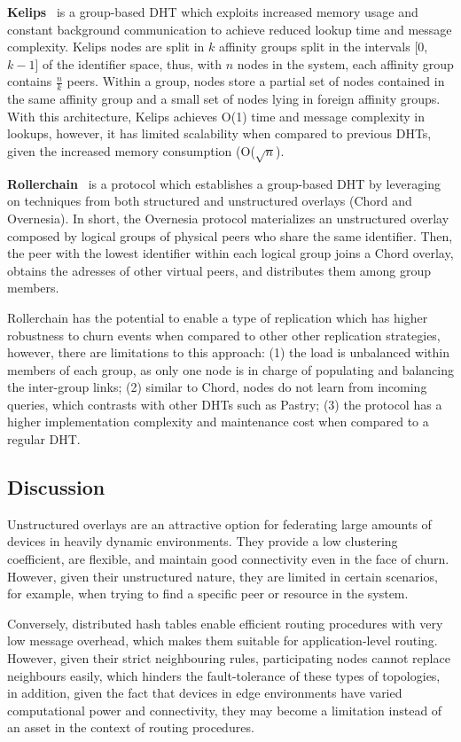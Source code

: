 \textbf{Kelips}~\cite{gupta2003kelips} is a group-based DHT which exploits increased memory usage and constant background communication to achieve reduced lookup time and message complexity. Kelips nodes are split in $k$ affinity groups split in the intervals [0,$k-1$] of the identifier space, thus, with $n$ nodes in the system, each affinity group contains $\frac{n}{k}$ peers. Within a group, nodes store a partial set of nodes contained in the same affinity group and a small set of nodes lying in foreign affinity groups. With this architecture, Kelips achieves O(1) time and message complexity in lookups, however, it has limited scalability when compared to previous DHTs, given the increased memory consumption (O($\sqrt{n}$).

\textbf{Rollerchain}~\cite{rollerchain} is a protocol which establishes a group-based DHT by leveraging on techniques from both structured and unstructured  overlays (Chord and Overnesia). In short, the Overnesia protocol materializes an unstructured overlay composed by logical groups of physical peers who share the same identifier. Then, the peer with the lowest identifier within each logical group joins a Chord overlay, obtains the adresses of other virtual peers, and distributes them among group members.

Rollerchain has the potential to enable a type of replication which has higher robustness to churn events when compared to other other replication strategies, however, there are limitations to this approach: (1) the load is unbalanced within members of each group, as only one node is in charge of populating and balancing the inter-group links; (2) similar to Chord, nodes do not learn from incoming queries, which contrasts with other DHTs such as Pastry; (3) the protocol has a higher implementation complexity and maintenance cost when compared to a regular DHT.

\subsection{Discussion}

Unstructured overlays are an attractive option for federating large amounts of devices in heavily dynamic environments. They provide a low clustering coefficient, are flexible, and maintain good connectivity even in the face of churn. However, given their unstructured nature, they are limited in certain scenarios, for example, when trying to find a specific peer or resource in the system.

Conversely, distributed hash tables enable efficient routing procedures with very low message overhead, which makes them suitable for application-level routing. However, given their strict neighbouring rules, participating nodes cannot replace neighbours easily, which hinders the fault-tolerance of these types of topologies, in addition, given the fact that devices in edge environments have varied computational power and connectivity, they may become a limitation instead of an asset in the context of routing procedures. 

